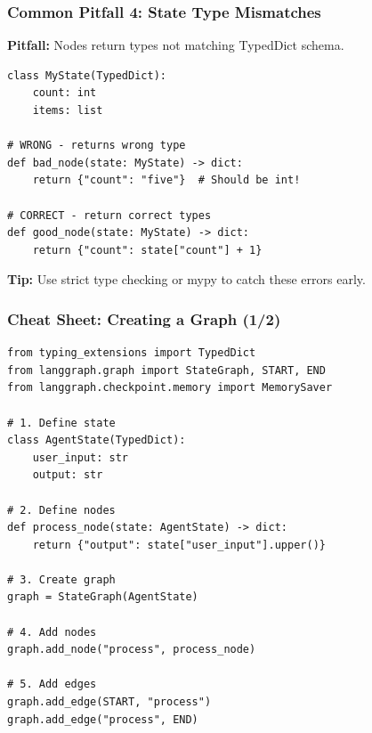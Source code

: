 \documentclass[aspectratio=169,11pt]{beamer}
\begin{document}
\begin{frame}[fragile]
\frametitle{Common Pitfall 4: State Type Mismatches}
\textbf{Pitfall:} Nodes return types not matching TypedDict schema.

\vspace{10pt}
\begin{lstlisting}
class MyState(TypedDict):
    count: int
    items: list

# WRONG - returns wrong type
def bad_node(state: MyState) -> dict:
    return {"count": "five"}  # Should be int!

# CORRECT - return correct types
def good_node(state: MyState) -> dict:
    return {"count": state["count"] + 1}
\end{lstlisting}

\vspace{10pt}
\textbf{Tip:} Use strict type checking or mypy to catch these errors early.
\end{frame}

\begin{frame}[fragile]
\frametitle{Cheat Sheet: Creating a Graph (1/2)}
\begin{lstlisting}
from typing_extensions import TypedDict
from langgraph.graph import StateGraph, START, END
from langgraph.checkpoint.memory import MemorySaver

# 1. Define state
class AgentState(TypedDict):
    user_input: str
    output: str

# 2. Define nodes
def process_node(state: AgentState) -> dict:
    return {"output": state["user_input"].upper()}

# 3. Create graph
graph = StateGraph(AgentState)

# 4. Add nodes
graph.add_node("process", process_node)

# 5. Add edges
graph.add_edge(START, "process")
graph.add_edge("process", END)
\end{lstlisting}
\end{frame}
\end{document}
